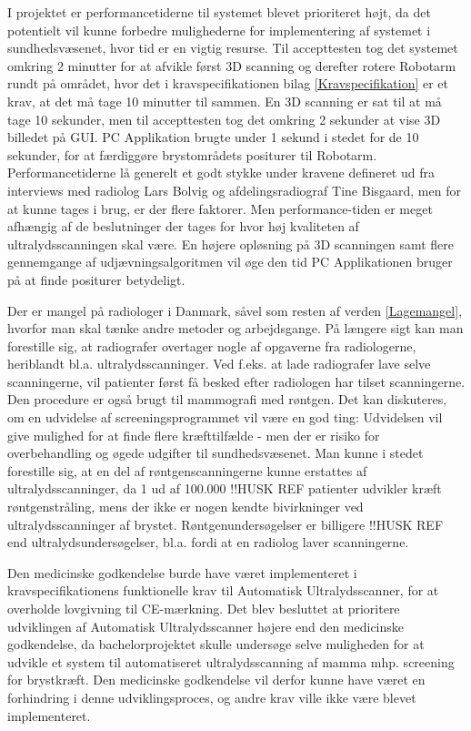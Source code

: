I projektet er performancetiderne til systemet blevet prioriteret højt, da det potentielt vil kunne forbedre mulighederne for implementering af systemet i sundhedsvæsenet, hvor tid er en vigtig resurse. Til accepttesten tog det systemet omkring 2 minutter for at afvikle først 3D scanning og derefter rotere Robotarm rundt på området, hvor det i kravspecifikationen bilag \ref{Kravspecifikation} er et krav, at det må tage 10 minutter til sammen. En 3D scanning er sat til at må tage 10 sekunder, men til accepttesten tog det omkring 2 sekunder at vise 3D billedet på GUI. PC Applikation brugte under 1 sekund i stedet for de 10 sekunder, for at færdiggøre brystområdets positurer til Robotarm. Performancetiderne lå generelt et godt stykke under kravene defineret ud fra interviews med radiolog Lars Bolvig og afdelingsradiograf Tine Bisgaard, men for at kunne tages i brug, er der flere faktorer. Men performance-tiden er meget afhængig af de beslutninger der tages for hvor høj kvaliteten af ultralydsscanningen skal være. En højere opløsning på 3D scanningen samt flere gennemgange af udjævningsalgoritmen vil øge den tid PC Applikationen bruger på at finde positurer betydeligt.  

Der er mangel på radiologer i Danmark, såvel som resten af verden \ref{Lagemangel}, hvorfor man skal tænke andre metoder og arbejdsgange. På længere sigt kan man forestille sig, at radiografer overtager nogle af opgaverne fra radiologerne, heriblandt bl.a. ultralydsscanninger. Ved f.eks. at lade radiografer lave selve scanningerne, vil patienter først få besked efter radiologen har tilset scanningerne. Den procedure er også brugt til mammografi med røntgen. Det kan diskuteres, om en udvidelse af screeningsprogrammet vil være en god ting: Udvidelsen vil give mulighed for at finde flere kræfttilfælde - men der er risiko for overbehandling og øgede udgifter til sundhedsvæsenet. Man kunne i stedet forestille sig, at en del af røntgenscanningerne kunne erstattes af ultralydsscanninger, da 1 ud af 100.000 !!HUSK REF patienter udvikler kræft røntgenstråling, mens der ikke er nogen kendte bivirkninger ved ultralydsscanninger af brystet. Røntgenundersøgelser er billigere !!HUSK REF end ultralydsundersøgelser, bl.a. fordi at en radiolog laver scanningerne. 

Den medicinske godkendelse burde have været implementeret i kravspecifikationens funktionelle krav til Automatisk Ultralydsscanner, for at overholde lovgivning til CE-mærkning. Det blev besluttet at prioritere udviklingen af Automatisk Ultralydsscanner højere end den medicinske godkendelse, da bachelorprojektet skulle undersøge selve muligheden for at udvikle et system til automatiseret ultralydsscanning af mamma mhp. screening for brystkræft. Den medicinske godkendelse vil derfor kunne have været en forhindring i denne udviklingsproces, og andre krav ville ikke være blevet implementeret. 

